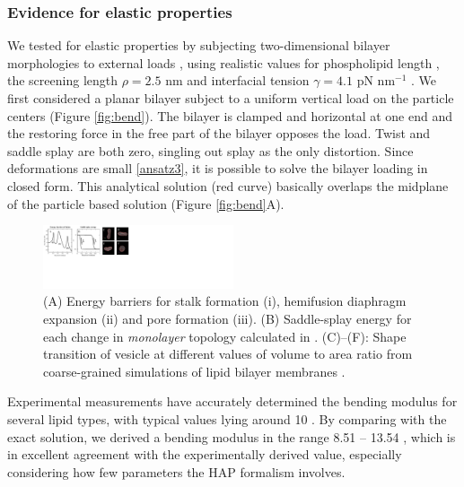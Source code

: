 \subsubsection{Evidence for elastic properties}
\label{sssec:evidence}
We tested for elastic properties by subjecting two-dimensional bilayer morphologies
to external loads \cite{Fu19}, using realistic
values for phospholipid length \cite{Boal},
the screening length $\rho = 2.5$ nm \cite{Eriksson1989,Lin2005,Parsegian,Israelachvili80,TerziDeserno17}
and  interfacial tension $\gamma=4.1$ pN nm$^{-1}$  \cite{GarciaSaez, KUZMIN2005, Petelska2012}.
We first considered a planar bilayer subject to a uniform vertical load on the particle centers (Figure \ref{fig:bend}). 
The bilayer is clamped and horizontal at one end and the restoring force in the free part 
of the bilayer opposes the load. Twist and saddle splay are both zero, singling out splay
as the only distortion.
Since deformations are small \eqref{ansatz3}, it is possible to solve the bilayer loading in closed form. 
This analytical solution (red curve) basically overlaps the midplane of the particle based solution (Figure \ref{fig:bend}A). 

\begin{figure}
\centerline{\includegraphics[width=0.5\textwidth]{figures/SA1_fig3.pdf}}
\caption{{\footnotesize (A) Energy barriers for stalk formation (i), hemifusion
diaphragm expansion (ii) and pore formation (iii). 
(B) Saddle-splay energy for each change in \emph{monolayer} topology
calculated in \cite{RyKlYaCo16}. (C)--(F): Shape transition of vesicle at different values of volume to area ratio from coarse-grained simulations of lipid bilayer membranes \cite{Fu16}.}}
\label{fig:barriers}
\end{figure}
Experimental measurements have accurately determined 
the bending modulus for several lipid types, with 
typical values lying around 10 \kBT\; \cite{Naetal15,VeBrPa15,NAGLE2000159,PhysRevLett.113.248102}.
By comparing with the exact solution, we derived a bending modulus
in the range 8.51 -- 13.54 \kBT, which is in 
excellent agreement with the experimentally derived value, especially considering how few parameters the HAP 
formalism involves. 

